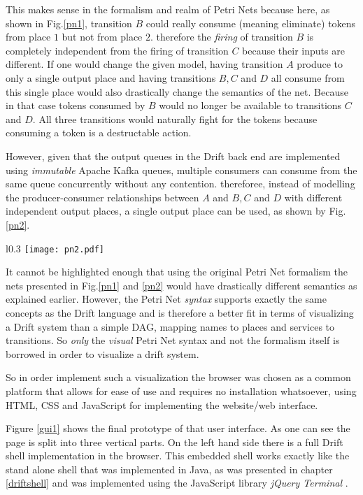 This makes sense in the formalism and realm of Petri Nets because
here, as shown in Fig.\ref{pn1}, transition $B$ could really consume
(meaning eliminate) tokens from place $1$ but not from place $2$.
therefore the \textit{firing} of transition $B$ is completely
independent from the firing of transition $C$ because their inputs
are different. If one would change the given model, having transition
$A$ produce to only a single output place and having transitions
$B, C$ and $D$ all consume from this single place would also
drastically change the semantics of the net. Because in that case
tokens consumed by $B$ would no longer be available to transitions
$C$ and $D$. All three transitions would naturally fight for the
tokens because consuming a token is a destructable action.
\newline

However, given that the output queues in the Drift back end
are implemented using \textit{immutable} Apache Kafka queues, multiple
consumers can consume from the same queue concurrently without
any contention. thereforee, instead of modelling the
producer-consumer relationships between $A$ and $B, C$ and $D$
with different independent output places, a single output
place can be used, as shown by Fig.\ref{pn2}.

\begin{wrapfigure}{l}{0.3\textwidth}
  \texttt{[image: pn2.pdf]}
  \caption{Minimized net with \textit{different} semantics.}
  \label{pn2}
\end{wrapfigure}

It cannot be highlighted enough that using the original Petri Net
formalism the nets presented in Fig.\ref{pn1} and \ref{pn2} would
have drastically different semantics as explained earlier.
However, the Petri Net \textit{syntax} supports exactly the
same concepts as the Drift language and is therefore a better fit in terms
of visualizing a Drift system than a simple DAG, mapping names
to places and services to transitions. So \textit{only} the
\textit{visual} Petri Net syntax and not the
formalism itself is borrowed in order to visualize a drift system.

So in order implement such a visualization the browser was chosen
as a common platform that allows for ease of use and requires no
installation whatsoever, using HTML, CSS and JavaScript for
implementing the website/web interface.

Figure \ref{gui1} shows the final prototype of that user interface.
As one can see the page is split into three vertical parts. On the left
hand side there is a full Drift shell implementation in the
browser. This embedded shell works exactly like the stand alone
shell that was implemented in Java, as was presented in chapter
\ref{driftshell} and was implemented using the JavaScript
library \textit{jQuery Terminal} \cite{jqueryterminaljs}.

